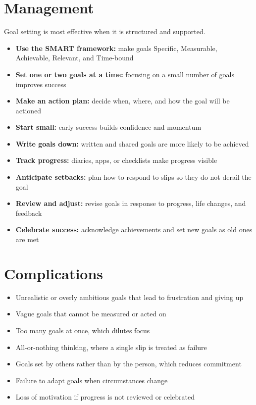 \section*{Management}
Goal setting is most effective when it is structured and supported.

\begin{itemize}
    \item \textbf{Use the SMART framework:} make goals Specific, Measurable, Achievable, Relevant, and Time-bound
    \item \textbf{Set one or two goals at a time:} focusing on a small number of goals improves success
    \item \textbf{Make an action plan:} decide when, where, and how the goal will be actioned
    \item \textbf{Start small:} early success builds confidence and momentum
    \item \textbf{Write goals down:} written and shared goals are more likely to be achieved
    \item \textbf{Track progress:} diaries, apps, or checklists make progress visible
    \item \textbf{Anticipate setbacks:} plan how to respond to slips so they do not derail the goal
    \item \textbf{Review and adjust:} revise goals in response to progress, life changes, and feedback
    \item \textbf{Celebrate success:} acknowledge achievements and set new goals as old ones are met
\end{itemize}

\section*{Complications}
\begin{itemize}
    \item Unrealistic or overly ambitious goals that lead to frustration and giving up
    \item Vague goals that cannot be measured or acted on
    \item Too many goals at once, which dilutes focus
    \item All-or-nothing thinking, where a single slip is treated as failure
    \item Goals set by others rather than by the person, which reduces commitment
    \item Failure to adapt goals when circumstances change
    \item Loss of motivation if progress is not reviewed or celebrated
\end{itemize}

